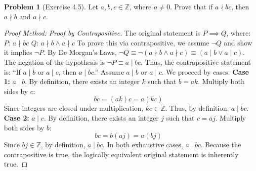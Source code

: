 \documentclass[11pt]{article}
\theoremstyle{definition}
\newtheorem{problem}{Problem}
\theoremstyle{remark}
\begin{document}
\begin{problem}[Exercise 4.5]
Let $a, b, c \in \mathbb{Z}$, where $a \neq 0$. Prove that if $a \nmid bc$, then $a \nmid b$ and $a \nmid c$.
\end{problem}
\begin{proof}[Proof Method: Proof by Contrapositive]
The original statement is $P \implies Q$, where:
$P$: $a \nmid bc$
$Q$: $a \nmid b \land a \nmid c$
To prove this via contrapositive, we assume $\neg Q$ and show it implies $\neg P$. 
By De Morgan's Laws, $\neg Q \equiv \neg (a \nmid b \land a \nmid c) \equiv (a \mid b \lor a \mid c)$.
The negation of the hypothesis is $\neg P \equiv a \mid bc$.
Thus, the contrapositive statement is: ``If $a \mid b$ or $a \mid c$, then $a \mid bc$.''
Assume $a \mid b$ or $a \mid c$. We proceed by cases.
\textbf{Case 1:} $a \mid b$.
By definition, there exists an integer $k$ such that $b = ak$.
Multiply both sides by $c$:
\[ bc = (ak)c = a(kc) \]
Since integers are closed under multiplication, $kc \in \mathbb{Z}$. Thus, by definition, $a \mid bc$.
\textbf{Case 2:} $a \mid c$.
By definition, there exists an integer $j$ such that $c = aj$.
Multiply both sides by $b$:
\[ bc = b(aj) = a(bj) \]
Since $bj \in \mathbb{Z}$, by definition, $a \mid bc$.
In both exhaustive cases, $a \mid bc$. Because the contrapositive is true, the logically equivalent original statement is inherently true.
\end{proof}

\vspace{1em}
\end{document}
